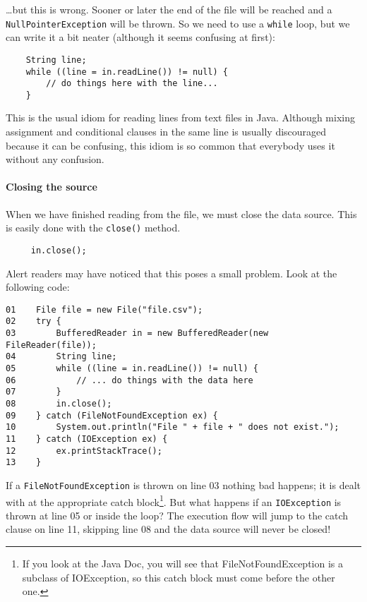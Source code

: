 \ldots but this is wrong. Sooner or later the end of the file will be
reached and a \verb+NullPointerException+ will be thrown. So we need
to use a \verb+while+ loop, but we can write it a bit neater (although
it seems confusing at first): 

\begin{verbatim}
    String line;
    while ((line = in.readLine()) != null) {
        // do things here with the line...
    }
\end{verbatim}

This is the usual idiom for reading lines from text files in
Java. Although mixing assignment and conditional clauses in the same
line is usually discouraged because it can be confusing, this idiom is
so common that everybody uses it without any confusion. 

\paragraph{Closing the source}
\label{sec:closing-source}

When we have finished reading from the file, we must close the
data source. This is easily done with the \verb+close()+ method. 

\begin{verbatim}
     in.close();
\end{verbatim}

Alert readers may have noticed that this poses a small problem. Look
at the following code: 

\label{code:basic-example}
\begin{verbatim}
01    File file = new File("file.csv");
02    try {
03        BufferedReader in = new BufferedReader(new FileReader(file)); 
04        String line;
05        while ((line = in.readLine()) != null) {
06            // ... do things with the data here
07        }
08        in.close();
09    } catch (FileNotFoundException ex) {
10        System.out.println("File " + file + " does not exist.");
11    } catch (IOException ex) {
12        ex.printStackTrace();
13    }    
\end{verbatim}

If a \verb+FileNotFoundException+ is thrown on 
line 03 nothing bad
happens; it is dealt with at the appropriate catch block\footnote{If
  you look at the Java Doc, you will see that FileNotFoundException is
  a subclass of IOException, so this catch block must come before the
  other one.}. But what
happens if an \verb+IOException+ is thrown at 
line 05 or inside the loop? 
The execution flow will jump to the catch clause on 
line 11, skipping 
line 08 
and the data source will never be closed! 

